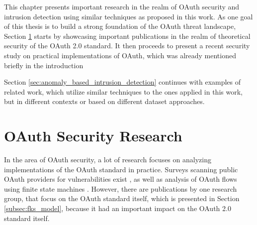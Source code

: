 This chapter presents important research in the realm of OAuth security and intrusion detection using similar techniques as proposed in this work. As one goal of this thesis is to build a strong foundation of the OAuth threat landscape, Section \ref{sec:oauth_security_research} starts by showcasing important publications in the realm of theoretical security of the OAuth 2.0 standard. It then proceeds to present a recent security study on practical implementations of OAuth, which was already mentioned briefly in the introduction

Section \ref{sec:anomaly_based_intrusion_detection} continues with examples of related work, which utilize similar techniques to the ones applied in this work, but in different contexts or based on different dataset approaches.

\section{OAuth Security Research}
\label{sec:oauth_security_research}
In the area of OAuth security, a lot of research focuses on analyzing implementations of the OAuth standard in practice. Surveys scanning public OAuth providers for vulnerabilities exist \cite{philippaerts2022oauch}, as well as analysis of OAuth flows using finite state machines \cite{munonye2022machine}. However, there are publications by one research group, that focus on the OAuth standard itself, which is presented in  Section \ref{subsec:fks_model}, because it had an important impact on the OAuth 2.0 standard itself.

